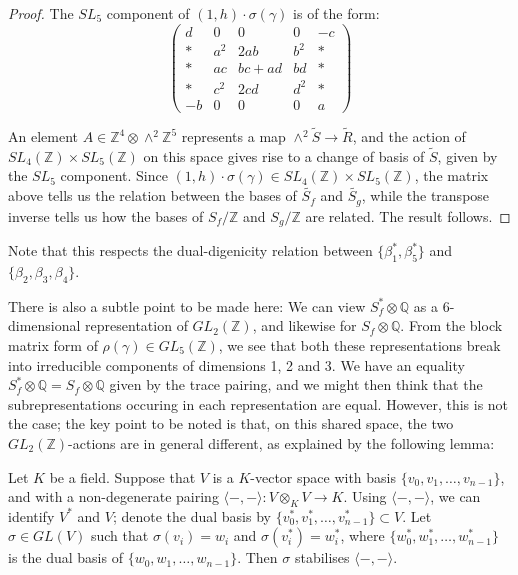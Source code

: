 \documentclass{report}
\begin{document}
\begin{proof}
The $SL_5$ component of $(1,h) \cdot \sigma ( \gamma )$ is of the form:
\begin{equation}
\begin{pmatrix}
d & 0 & 0 & 0 & - c \\
* & a^2 & 2ab & b^2 & * \\
* & ac & bc+ad & bd & * \\
* & c^2 & 2cd & d^2 & * \\
- b & 0 & 0 & 0 & a
\end{pmatrix}
\end{equation}

An element $A \in \mathbb{Z}^4 \otimes \wedge^2 \mathbb{Z}^5$ represents a map $\wedge^2 \tilde{S} \to \tilde{R}$, and the action of $SL_4(\mathbb{Z}) \times SL_5(\mathbb{Z})$ on this space gives rise to a change of basis of $\tilde{S}$, given by the $SL_5$ component.  Since $(1,h) \cdot \sigma ( \gamma ) \in SL_4(\mathbb{Z}) \times SL_5(\mathbb{Z})$, the matrix above tells us the relation between the bases of $\tilde{S_f}$ and $\tilde{S_g}$, while the transpose inverse tells us how the bases of $S_f / \mathbb{Z}$ and $S_g / \mathbb{Z}$ are related.  The result follows.
\end{proof}

Note that this respects the dual-digenicity relation between $\{ \beta_1^*, \beta_5^* \}$ and $\{ \beta_2, \beta_3, \beta_4 \}$.

There is also a subtle point to be made here: We can view $S_f^* \otimes \mathbb{Q}$ as a 6-dimensional representation of $GL_2(\mathbb{Z})$, and likewise for $S_f \otimes \mathbb{Q}$.  From the block matrix form of $\rho (\gamma) \in GL_5(\mathbb{Z})$, we see that both these representations break into irreducible components of dimensions 1, 2 and 3.  We have an equality $S_f^* \otimes \mathbb{Q} = S_f \otimes \mathbb{Q}$ given by the trace pairing, and we might then think that the subrepresentations occuring in each representation are equal.  However, this is not the case; the key point to be noted is that, on this shared space, the two $GL_2(\mathbb{Z})$-actions are in general different, as explained by the following lemma:

\begin{lemma}
Let $K$ be a field.  Suppose that $V$ is a $K$-vector space with basis $\{v_0,v_1,\ldots,v_{n-1}\}$, and with a non-degenerate pairing $\langle -,- \rangle : V \otimes_K V \to K$.  Using $\langle -,- \rangle$, we can identify $V^*$ and $V$; denote the dual basis by $\{v_0^*,v_1^*,\ldots,v_{n-1}^*\} \subset V$.  Let $\sigma \in GL(V)$ such that $\sigma(v_i) = w_i$ and $\sigma(v_i^*) = w_i^*$, where $\{w_0^*,w_1^*,\ldots,w_{n-1}^*\}$ is the dual basis of $\{w_0,w_1,\ldots,w_{n-1}\}$.  Then $\sigma$ stabilises $\langle -,- \rangle$.
\end{lemma}
\end{document}
